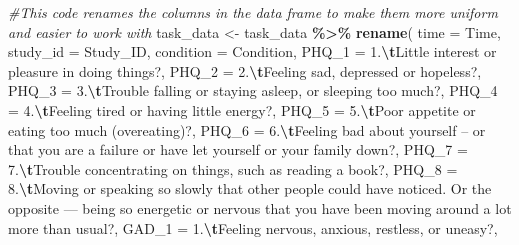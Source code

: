 \documentclass[
]{article}
\newenvironment{Shaded}{\begin{snugshade}}{\end{snugshade}}
\newcommand{\AttributeTok}[1]{\textcolor[rgb]{0.13,0.29,0.53}{#1}}
\newcommand{\CommentTok}[1]{\textcolor[rgb]{0.56,0.35,0.01}{\textit{#1}}}
\newcommand{\FunctionTok}[1]{\textcolor[rgb]{0.13,0.29,0.53}{\textbf{#1}}}
\newcommand{\NormalTok}[1]{#1}
\newcommand{\OtherTok}[1]{\textcolor[rgb]{0.56,0.35,0.01}{#1}}
\newcommand{\SpecialCharTok}[1]{\textcolor[rgb]{0.81,0.36,0.00}{\textbf{#1}}}
\newcommand{\StringTok}[1]{\textcolor[rgb]{0.31,0.60,0.02}{#1}}
\begin{document}
\begin{Shaded}
\begin{Highlighting}[]
\CommentTok{\#This code renames the columns in the data frame to make them more uniform and easier to work with}
\NormalTok{task\_data }\OtherTok{\textless{}{-}}\NormalTok{ task\_data }\SpecialCharTok{\%\textgreater{}\%}
  \FunctionTok{rename}\NormalTok{(}
    \AttributeTok{time =}\NormalTok{ Time,}
    \AttributeTok{study\_id =}\NormalTok{ Study\_ID,}
    \AttributeTok{condition =}\NormalTok{ Condition,}
    \AttributeTok{PHQ\_1 =} \StringTok{\textasciigrave{}}\AttributeTok{1.}\SpecialCharTok{\textbackslash{}t}\AttributeTok{Little interest or pleasure in doing things?}\StringTok{\textasciigrave{}}\NormalTok{,}
    \AttributeTok{PHQ\_2 =} \StringTok{\textasciigrave{}}\AttributeTok{2.}\SpecialCharTok{\textbackslash{}t}\AttributeTok{Feeling sad, depressed or hopeless?}\StringTok{\textasciigrave{}}\NormalTok{,}
    \AttributeTok{PHQ\_3 =} \StringTok{\textasciigrave{}}\AttributeTok{3.}\SpecialCharTok{\textbackslash{}t}\AttributeTok{Trouble falling or staying asleep, or sleeping too much?}\StringTok{\textasciigrave{}}\NormalTok{,}
    \AttributeTok{PHQ\_4 =} \StringTok{\textasciigrave{}}\AttributeTok{4.}\SpecialCharTok{\textbackslash{}t}\AttributeTok{Feeling tired or having little energy?}\StringTok{\textasciigrave{}}\NormalTok{,}
    \AttributeTok{PHQ\_5 =} \StringTok{\textasciigrave{}}\AttributeTok{5.}\SpecialCharTok{\textbackslash{}t}\AttributeTok{Poor appetite or eating too much (overeating)?}\StringTok{\textasciigrave{}}\NormalTok{,}
    \AttributeTok{PHQ\_6 =} \StringTok{\textasciigrave{}}\AttributeTok{6.}\SpecialCharTok{\textbackslash{}t}\AttributeTok{Feeling bad about yourself – or that you are a failure or have let yourself or your family down?}\StringTok{\textasciigrave{}}\NormalTok{,}
    \AttributeTok{PHQ\_7 =} \StringTok{\textasciigrave{}}\AttributeTok{7.}\SpecialCharTok{\textbackslash{}t}\AttributeTok{Trouble concentrating on things, such as reading a book?}\StringTok{\textasciigrave{}}\NormalTok{,}
    \AttributeTok{PHQ\_8 =} \StringTok{\textasciigrave{}}\AttributeTok{8.}\SpecialCharTok{\textbackslash{}t}\AttributeTok{Moving or speaking so slowly that other people could have noticed. Or the opposite — being so energetic or nervous that you have been moving around a lot more than usual?}\StringTok{\textasciigrave{}}\NormalTok{,}
    \AttributeTok{GAD\_1 =} \StringTok{\textasciigrave{}}\AttributeTok{1.}\SpecialCharTok{\textbackslash{}t}\AttributeTok{Feeling nervous, anxious, restless, or uneasy?}\StringTok{\textasciigrave{}}\NormalTok{,}

\end{Highlighting}
\end{Shaded}
\end{document}
